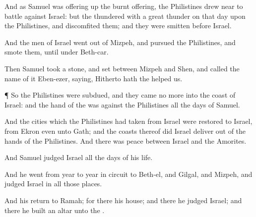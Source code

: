{And as
Samuel was offering
up the burnt
offering, the
Philistines drew
near to
battle against
Israel: but the
{}
thundered with a
great
thunder on that
day upon the
Philistines, and
discomfited them; and they were
smitten
before
Israel.

And the
men of
Israel went
out of
Mizpeh, and
pursued the
Philistines, and
smote them, until
{} under
Beth-car.

Then
Samuel
took
a
stone, and
set
{} between
Mizpeh and
Shen, and
called the
name of it
Eben-ezer,
saying, Hitherto hath the
{}
helped us.


\par }{\PP {}¶ So the
Philistines were
subdued, and they
came no
more into the
coast of
Israel: and the
hand of the
{} was against the
Philistines all the
days of
Samuel.

And the
cities which the
Philistines had
taken from
Israel were
restored to
Israel, from
Ekron even unto
Gath; and the
coasts thereof did
Israel
deliver out of the
hands of the
Philistines. And there was
peace between
Israel and the
Amorites.

And
Samuel
judged
Israel all the
days of his
life.

And he
went
from
year to
year in
circuit to
Beth-el, and
Gilgal, and
Mizpeh, and
judged
Israel in all those
places.

And his
return
{} to
Ramah; for there
{} his
house; and there he
judged
Israel; and there he
built an
altar unto the
{}.




\par }
